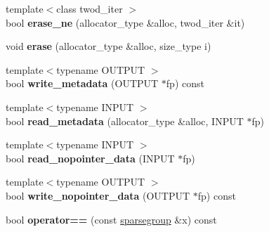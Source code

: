\begin{DoxyCompactItemize}
\item 
{\footnotesize template$<$class twod\+\_\+iter $>$ }\\bool {\bfseries erase\+\_\+ne} (allocator\+\_\+type \&alloc, twod\+\_\+iter \&it)\hypertarget{classspp___1_1sparsegroup_a5e311fe6918c8c1dc7d6791887207451}{}\label{classspp___1_1sparsegroup_a5e311fe6918c8c1dc7d6791887207451}

\item 
void {\bfseries erase} (allocator\+\_\+type \&alloc, size\+\_\+type i)\hypertarget{classspp___1_1sparsegroup_a5f41269491e5040cc942b7d8fb8384b6}{}\label{classspp___1_1sparsegroup_a5f41269491e5040cc942b7d8fb8384b6}

\item 
{\footnotesize template$<$typename O\+U\+T\+P\+UT $>$ }\\bool {\bfseries write\+\_\+metadata} (O\+U\+T\+P\+UT $\ast$fp) const \hypertarget{classspp___1_1sparsegroup_a99843d3078698eed427998884b9ba882}{}\label{classspp___1_1sparsegroup_a99843d3078698eed427998884b9ba882}

\item 
{\footnotesize template$<$typename I\+N\+P\+UT $>$ }\\bool {\bfseries read\+\_\+metadata} (allocator\+\_\+type \&alloc, I\+N\+P\+UT $\ast$fp)\hypertarget{classspp___1_1sparsegroup_aec5b73df885b1b1a3279e64ac5125b95}{}\label{classspp___1_1sparsegroup_aec5b73df885b1b1a3279e64ac5125b95}

\item 
{\footnotesize template$<$typename I\+N\+P\+UT $>$ }\\bool {\bfseries read\+\_\+nopointer\+\_\+data} (I\+N\+P\+UT $\ast$fp)\hypertarget{classspp___1_1sparsegroup_aa22c6c0cd056e3ba2c641ac1245ae1b8}{}\label{classspp___1_1sparsegroup_aa22c6c0cd056e3ba2c641ac1245ae1b8}

\item 
{\footnotesize template$<$typename O\+U\+T\+P\+UT $>$ }\\bool {\bfseries write\+\_\+nopointer\+\_\+data} (O\+U\+T\+P\+UT $\ast$fp) const \hypertarget{classspp___1_1sparsegroup_a16a97ce40a9b7ba5c122f6e65959754f}{}\label{classspp___1_1sparsegroup_a16a97ce40a9b7ba5c122f6e65959754f}

\item 
bool {\bfseries operator==} (const \hyperlink{classspp___1_1sparsegroup}{sparsegroup} \&x) const \hypertarget{classspp___1_1sparsegroup_a7dacaecec2b3545257bdc0a262ae64ca}{}\label{classspp___1_1sparsegroup_a7dacaecec2b3545257bdc0a262ae64ca}


\end{DoxyCompactItemize}
